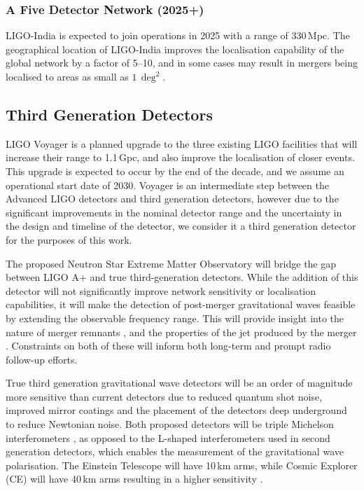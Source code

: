 \subsubsection{A Five Detector Network (2025+)}
LIGO-India \citep{M1100296-v2} is expected to join operations in 2025 with a range of 330\,Mpc. The geographical location of LIGO-India improves the localisation capability of the global network by a factor of 5--10, and in some cases may result in mergers being localised to areas as small as $1\,\deg^2$.

\subsection{Third Generation Detectors}
\label{subsec:3g_detectors}
LIGO Voyager \citep{T1900409-v5} is a planned upgrade to the three existing LIGO facilities that will increase their range to 1.1\,Gpc, and also improve the localisation of closer events. This upgrade is expected to occur by the end of the decade, and we assume an operational start date of 2030. Voyager is an intermediate step between the Advanced LIGO detectors and third generation detectors, however due to the significant improvements in the nominal detector range and the uncertainty in the design and timeline of the detector, we consider it a third generation detector for the purposes of this work.

The proposed Neutron Star Extreme Matter Observatory \citep[NEMO;][]{2020arXiv200703128A} will bridge the gap between LIGO A+ and true third-generation detectors. While the addition of this detector will not significantly improve network sensitivity or localisation capabilities, it will make the detection of post-merger gravitational waves feasible by extending the observable frequency range. This will provide insight into the nature of merger remnants \citep{2019ApJ...875..160A}, and the properties of the jet produced by the merger \citep[e.g.,][]{2020ApJ...895L..33B}. Constraints on both of these will inform both long-term and prompt radio follow-up efforts.

True third generation gravitational wave detectors will be an order of magnitude more sensitive than current detectors due to reduced quantum shot noise, improved mirror coatings and the placement of the detectors deep underground to reduce Newtonian noise. Both proposed detectors will be triple Michelson interferometers \citep{2009CQGra..26h5012F}, as opposed to the L-shaped interferometers used in second generation detectors, which enables the measurement of the gravitational wave polarisation. The Einstein Telescope \citep[ET;][]{2010CQGra..27s4002P} will have 10\,km arms, while Cosmic Explorer (CE) will have 40\,km arms resulting in a higher sensitivity \citep{2017CQGra..34d4001A}.


